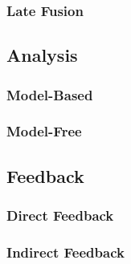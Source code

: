 \documentclass[manuscript,screen,review]{acmart}
\begin{document}

\subsubsection{Late Fusion}


\subsection{Analysis}



\subsubsection{Model-Based}

\subsubsection{Model-Free}


\subsection{Feedback}

\subsubsection{Direct Feedback}


\subsubsection{Indirect Feedback}

\end{document}
